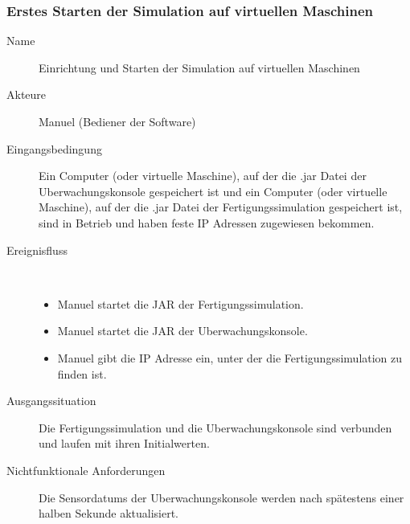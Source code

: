 \documentclass[parskip=full]{scrartcl}
\begin{document}
\subsubsection{Erstes Starten der Simulation auf virtuellen Maschinen}
\begin{description}
  \item[Name] Einrichtung und Starten der Simulation auf virtuellen Maschinen
  \item[Akteure] Manuel (Bediener der Software)
  \item[Eingangsbedingung] Ein Computer (oder virtuelle Maschine), auf der die .jar Datei der \gls{Uberwachungskonsole} gespeichert ist und ein Computer (oder virtuelle Maschine), auf der die .jar
    Datei der \gls{Fertigungssimulation} gespeichert ist, sind in Betrieb und haben feste IP Adressen zugewiesen bekommen.
  \item[Ereignisfluss]~\\
  \begin{itemize}[noitemsep]
    \item Manuel startet die JAR der \gls{Fertigungssimulation}.
    \item Manuel startet die JAR der \gls{Uberwachungskonsole}.
    \item Manuel gibt die IP Adresse ein, unter der die \gls{Fertigungssimulation} zu finden ist.
  \end{itemize}
  \item[Ausgangssituation] Die \gls{Fertigungssimulation} und die \gls{Uberwachungskonsole} sind verbunden und laufen mit ihren Initialwerten.
  \item[Nichtfunktionale Anforderungen] Die \glspl{Sensordatum} der \gls{Uberwachungskonsole} werden nach spätestens einer halben Sekunde aktualisiert.
\end{description}
 
\end{document}
